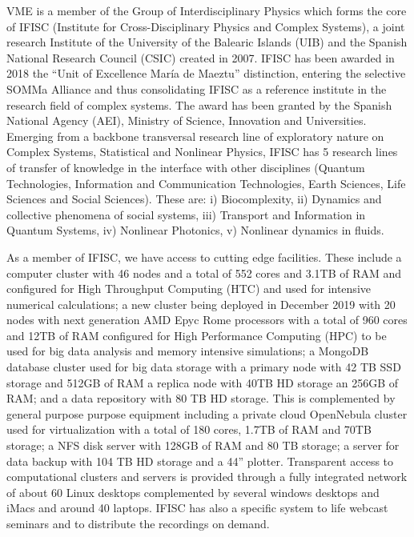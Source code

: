 \documentclass[authoryear,1p,12pt]{elsarticle}
\begin{document}
     
VME is a member of the Group of Interdisciplinary Physics which forms the core of  IFISC (Institute for Cross-Disciplinary Physics and Complex Systems), a joint research Institute of the University of the Balearic Islands (UIB) and the Spanish National Research Council (CSIC) created in 2007. IFISC has been awarded in 2018 the “Unit of Excellence María de Maeztu” distinction, entering the selective SOMMa Alliance and thus consolidating IFISC as a reference institute in the research field of complex systems. The award has been granted by the Spanish National Agency (AEI), Ministry of Science, Innovation and Universities. Emerging from a backbone transversal research line of exploratory nature on Complex Systems, Statistical and Nonlinear Physics, IFISC has 5 research lines of transfer of knowledge in the interface with other disciplines (Quantum Technologies, Information and Communication Technologies, Earth Sciences, Life Sciences and Social Sciences). These are: i) Biocomplexity, ii) Dynamics and collective phenomena of social systems, iii) Transport and Information in Quantum Systems, iv) Nonlinear Photonics, v) Nonlinear dynamics in fluids.



     
     As a member of IFISC, we have access to cutting edge facilities. These include a computer cluster with 46 nodes and a total of 552 cores and 3.1TB of RAM and configured for High Throughput Computing (HTC) and used for intensive numerical calculations; a new cluster being deployed in December 2019 with 20 nodes with next generation AMD Epyc Rome processors with a total of 960 cores and 12TB of RAM configured for High Performance Computing (HPC) to be used for big data analysis and memory intensive simulations; a MongoDB database cluster used for big data storage with a primary node with 42 TB SSD storage and 512GB of RAM a replica node with 40TB HD storage an 256GB of RAM; and a data repository with 80 TB HD storage. This is complemented by general purpose purpose equipment including a private cloud OpenNebula cluster used for virtualization with a total of 180 cores, 1.7TB of RAM and 70TB storage; a NFS disk server with 128GB of RAM and 80 TB  storage; a server for data backup with 104 TB HD storage and a 44'' plotter. Transparent access to computational clusters and servers is provided through a fully integrated network of about 60 Linux desktops complemented by several windows desktops and iMacs and around 40 laptops. IFISC has also a specific system to life webcast seminars and to distribute the recordings on demand.
     
\end{document}
